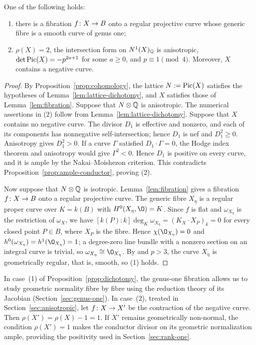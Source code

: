\begin{proposition}\label{prop:dichotomy}
One of the following holds:
\begin{enumerate}
\item there is a fibration $f\colon X\to B$ onto a regular projective curve whose generic fibre is a smooth curve of genus one;
\item $\rho(X) = 2$, the intersection form on $N^1(X)_{\mathbb{Q}}$ is anisotropic, $\det\operatorname{Pic}(X) = -p^{2a+1}$ for some $a\geq 0$, and $p\equiv 1\pmod 4$.
Moreover, $X$ contains a negative curve.
\end{enumerate}
\end{proposition}

\begin{proof}
By Proposition~\ref{prop:cohomology}, the lattice $N := \operatorname{Pic}(X)$ satisfies the hypotheses of Lemma~\ref{lem:lattice-dichotomy}, and $X$ satisfies those of Lemma~\ref{lem:fibration}.
Suppose that $N\otimes\mathbb{Q}$ is anisotropic.
The numerical assertions in \textup{(2)} follow from Lemma~\ref{lem:lattice-dichotomy}.
Suppose that $X$ contains no negative curve.
The divisor $D_1$ is effective and nonzero, and each of its components has nonnegative self-intersection; hence $D_1$ is nef and $D_1^2\geq 0$.
Anisotropy gives $D_1^2>0$.
If a curve $\Gamma$ satisfied $D_1\cdot\Gamma = 0$, the Hodge index theorem and anisotropy would give $\Gamma^2<0$.
Hence $D_1$ is positive on every curve, and it is ample by the Nakai--Moishezon criterion.
This contradicts Proposition~\ref{prop:ample-conductor}, proving \textup{(2)}.

Now suppose that $N\otimes\mathbb{Q}$ is isotropic.
Lemma~\ref{lem:fibration} gives a fibration $f\colon X\to B$ onto a regular projective curve.
The generic fibre $X_\eta$ is a regular proper curve over $K = k(B)$ with $H^0(X_\eta,\O) = K$.
Since $f$ is flat and $\omega_{X_\eta}$ is the restriction of $\omega_X$, we have $[k(P):k]\deg_K\omega_{X_\eta} = (K_X\cdot X_P)_k = 0$ for every closed point $P\in B$, where $X_P$ is the fibre.
Hence $\chi(\O_{X_\eta}) = 0$ and $h^0(\omega_{X_\eta}) = h^1(\O_{X_\eta}) = 1$; a degree-zero line bundle with a nonzero section on an integral curve is trivial, so $\omega_{X_\eta}\cong\O_{X_\eta}$.
By \cite[Theorem~2.3(i)]{Sch22} and $p>3$, the curve $X_\eta$ is geometrically regular, that is, smooth, so \textup{(1)} holds.
\end{proof}

In case~\textup{(1)} of Proposition~\ref{prop:dichotomy}, the genus-one fibration allows us to study geometric normality fibre by fibre using the reduction theory of its Jacobian (Section~\ref{sec:genus-one}).
In case~\textup{(2)}, treated in Section~\ref{sec:anisotropic}, let $f\colon X\to X'$ be the contraction of the negative curve.
Then $\rho(X') = \rho(X)-1 = 1$.
If $X'$ remains geometrically non-normal, the condition $\rho(X') = 1$ makes the conductor divisor on its geometric normalization ample, providing the positivity used in Section~\ref{sec:rank-one}.
